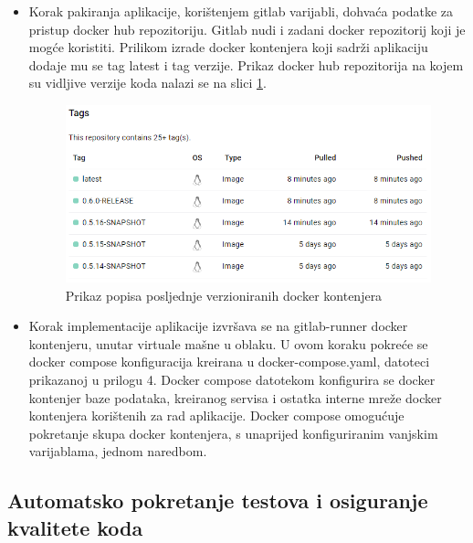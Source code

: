 \documentclass[a4paper,12pt,oneside]{article}
\begin{document}
\begin{itemize}

\item{Korak pakiranja aplikacije, korištenjem gitlab varijabli, dohvaća podatke za pristup docker hub repozitoriju. Gitlab nudi i zadani docker repozitorij koji je mogće koristiti. Prilikom izrade docker kontenjera koji sadrži aplikaciju dodaje mu se tag latest i tag verzije. Prikaz docker hub repozitorija na kojem su vidljive verzije koda nalazi se na slici \ref{fig:docker-versions}}. 

\begin{figure}
    \centering
    \includegraphics[width=0.6\linewidth]{Slike/docker-versions.png}
    \caption{Prikaz popisa posljednje verzioniranih docker kontenjera}
    \label{fig:docker-versions}
\end{figure}

\item Korak implementacije aplikacije izvršava se na gitlab-runner docker kontenjeru, unutar virtuale mašne u oblaku. U ovom koraku pokreće se docker compose konfiguracija kreirana u docker-compose.yaml, datoteci prikazanoj u prilogu 4. Docker compose datotekom konfigurira se docker kontenjer baze podataka, kreiranog servisa i ostatka interne mreže docker kontenjera korištenih za rad aplikacije. Docker compose omogućuje pokretanje skupa docker kontenjera, s unaprijed konfiguriranim vanjskim varijablama, jednom naredbom.




\end{itemize}


\subsection{Automatsko pokretanje testova i osiguranje kvalitete koda}
\end{document}
